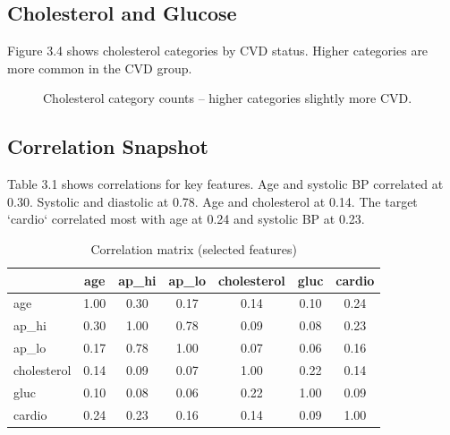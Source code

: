\documentclass[12pt, a4paper, oneside]{book}
\begin{document}
\subsection{Cholesterol and Glucose}
Figure 3.4 shows cholesterol categories by CVD status. Higher categories are more common in the CVD group.

\begin{figure}[H]
\centering
{}
\caption{Cholesterol category counts – higher categories slightly more CVD.}
\label{fig:chol_bar}
\end{figure}

\subsection{Correlation Snapshot}
Table 3.1 shows correlations for key features. Age and systolic BP correlated at 0.30. Systolic and diastolic at 0.78. Age and cholesterol at 0.14. The target `cardio` correlated most with age at 0.24 and systolic BP at 0.23.

\begin{table}[H]
\centering
\caption{Correlation matrix (selected features)}
\label{tab:corr}
\small
{}
\renewcommand{\arraystretch}{1.1}
\begin{tabular}{l S[table-format=1.2] S[table-format=1.2] S[table-format=1.2] S[table-format=1.2] S[table-format=1.2] S[table-format=1.2]}
\toprule
& {age} & {ap\_hi} & {ap\_lo} & {cholesterol} & {gluc} & {cardio} \\
\midrule
age          & 1.00 & 0.30 & 0.17 & 0.14 & 0.10 & 0.24 \\
ap\_hi       & 0.30 & 1.00 & 0.78 & 0.09 & 0.08 & 0.23 \\
ap\_lo       & 0.17 & 0.78 & 1.00 & 0.07 & 0.06 & 0.16 \\
cholesterol  & 0.14 & 0.09 & 0.07 & 1.00 & 0.22 & 0.14 \\
gluc         & 0.10 & 0.08 & 0.06 & 0.22 & 1.00 & 0.09 \\
cardio       & 0.24 & 0.23 & 0.16 & 0.14 & 0.09 & 1.00 \\
\bottomrule
\end{tabular}
\end{table}
\end{document}
